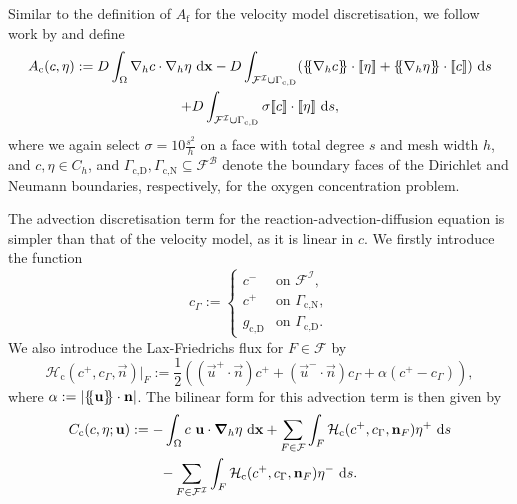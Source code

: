             Similar to the definition of $A_\text{f}$ for the velocity model discretisation, we follow work by \citeauthor{cangianiHpVersionDiscontinuousGalerkin2017} \cite{cangianiHpVersionDiscontinuousGalerkin2017} and define
            \begin{multline}
                A_\text{c}(c, \eta) := D \int_\Omega \nablab c \cdot \nablab \eta \diff\vec{x} - D \int_{\mathcal{F}^\mathcal{I} \cup \Gamma_\text{c,D}} (\average{\nablab c} \cdot \jump{\eta} + \average{\nablab \eta} \cdot \jump{c}) \diff s \\ + D \int_{\mathcal{F}^\mathcal{I} \cup \Gamma_\text{c,D}} \sigma \jump{c} \cdot \jump{\eta} \diff s,
            \end{multline}
            where we again select $\sigma = 10 \frac{s^2}{h}$ on a face with total degree $s$ and mesh width $h$, and $c, \eta \in C_h$, and $\Gamma_\text{c,D},\Gamma_\text{c,N} \subseteq \mathcal{F}^\mathcal{B}$ denote the boundary faces of the Dirichlet and Neumann boundaries, respectively, for the oxygen concentration problem.

            The advection discretisation term for the reaction-advection-diffusion equation is simpler than that of the velocity model, as it is linear in $c$. We firstly introduce the function
            \begin{equation}
                c_\Gamma := 
                \begin{cases}
                    c^- & \text{on~} \mathcal{F}^\mathcal{I}, \\
                    c^+ & \text{on~} \Gamma_\text{c,N}, \\
                    g_\text{c,D} & \text{on~} \Gamma_\text{c,D}.
                \end{cases}
                \label{eq:c_gamma}
            \end{equation}
            We also introduce the Lax-Friedrichs flux for $F \in \mathcal{F}$ by
            \begin{equation}
                \mathcal{H}_\text{c}(c^+, c_\Gamma, \vec{n})|_F := \frac{1}{2}((\vec{u}^+ \cdot \vec{n}) c^+ + (\vec{u}^- \cdot \vec{n}) c_\Gamma + \alpha(c^+ - c_\Gamma)),
            \end{equation}
            where $\alpha := |\{\negthickspace\{\boldsymbol{\mathbf{u}}\}\negthickspace\} \cdot \boldsymbol{\mathbf{n}}|$. The bilinear form for this advection term is then given by
            \begin{multline}
                C_\text{c}(c, \eta; \boldsymbol{\mathbf{u}}) := -\int_\Omega c ~ \boldsymbol{\mathbf{u}} \cdot \boldsymbol{\mathbf{\nabla}}_h \eta ~\mathrm{d} \boldsymbol{\mathbf{x}} + \sum_{F \in \mathcal{F}} \int_F \mathcal{H}_\text{c}(c^+, c_\Gamma, \boldsymbol{\mathbf{n}}_F)\eta^+ ~\mathrm{d} s \\ - \sum_{F \in \mathcal{F}^\mathcal{I}} \int_F \mathcal{H}_\text{c}(c^+, c_\Gamma, \boldsymbol{\mathbf{n}}_F)\eta^- ~\mathrm{d} s.
            \end{multline}            


